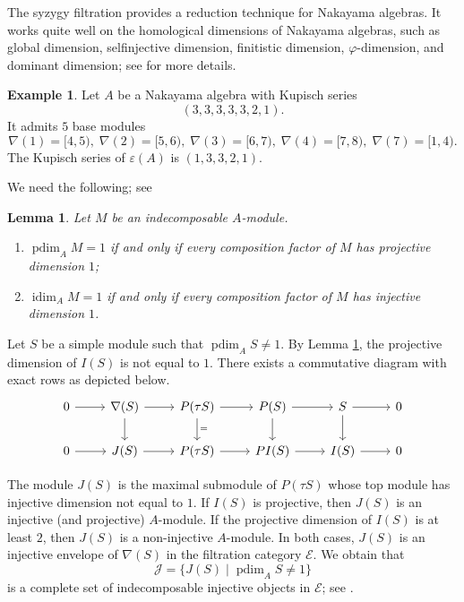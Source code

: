 \documentclass[a4paper,reqno]{amsart}
\numberwithin{equation}{section}
\theoremstyle{plain}
\newtheorem{lem}[thm]{Lemma}
\theoremstyle{definition}
\newtheorem{exam}[defn]{Example}
\theoremstyle{remark}
\DeclareMathOperator{\pdim}{pdim}
\DeclareMathOperator{\idim}{idim}
\renewcommand{\-}{\mbox{-}}
\newcommand{\scE}{\mathcal{E}}
\newcommand{\scJ}{\mathcal{J}}
\begin{document}
The syzygy filtration provides a reduction technique for Nakayama algebras.
It works quite well on the homological dimensions of Nakayama algebras, 
such as global dimension, selfinjective dimension, finitistic dimension, 
\(\varphi\)-dimension, and dominant dimension; see \cite{Sen19} for more details.



\begin{exam}
Let \(A\) be a Nakayama algebra with Kupisch series
\[ (3,3,3,3,3,2,1). \]
It admits \(5\) base modules 
\[\nabla(1)=[4,5),\;\nabla(2)=[5,6),\;\nabla(3)=[6,7),\;
\nabla(4)=[7,8),\;\nabla(7)=[1,4).\]
The Kupisch series of \(\varepsilon(A)\) is \((1,3,3,2,1)\).
\end{exam}

We need the following; see \cite{Rin21}






\begin{lem} \label{lem:madsen}
Let \(M\) be an indecomposable \(A\)-module.
\begin{enumerate}
    \item \(\pdim_AM=1\) if and only if every composition factor of \(M\) has projective dimension \(1\);
    \item \(\idim_AM=1\) if and only if every composition factor of \(M\) has injective dimension \(1\).
\end{enumerate}
\end{lem}


Let \(S\) be a  simple module such that \(\pdim_AS\neq 1\).
By Lemma \ref{lem:madsen}, 
the projective dimension of \(I(S)\) is not equal to \(1\).
There exists a commutative diagram with exact rows as depicted below.
\begin{equation} \label{eq:comdiag}
\begin{tikzcd}
0\arrow[r] &\nabla(S)\arrow[r,]\arrow[d,] &P(\tau{S})\arrow[r]\arrow[d,"="] 
&P(S) \arrow[r]\arrow[d] & S \arrow[r]\arrow[d] &0\\
0\arrow[r] &J(S) \arrow[r] &P(\tau{S})\arrow[r] &PI(S) \arrow[r] &I(S)\arrow[r] &0
\end{tikzcd}
\end{equation}


The module \(J(S)\) is the maximal submodule of \(P(\tau{S})\) whose top module 
has injective dimension not equal to \(1\).
If \(I(S)\) is projective, then \(J(S)\) is an injective (and projective) \(A\)-module.
If the projective dimension of \(I(S)\) is at least \(2\), 
then \(J(S)\) is a non-injective \(A\)-module.
In both cases, \(J(S)\) is an injective envelope of \(\nabla(S)\) 
in the filtration category \(\scE\).
We obtain that
\[\scJ=\{J(S)\mid \pdim_AS\neq 1\}\]
is a complete set of indecomposable injective objects in \(\scE\); 
see \cite[Lemma 3.3]{She26}.
\end{document}
